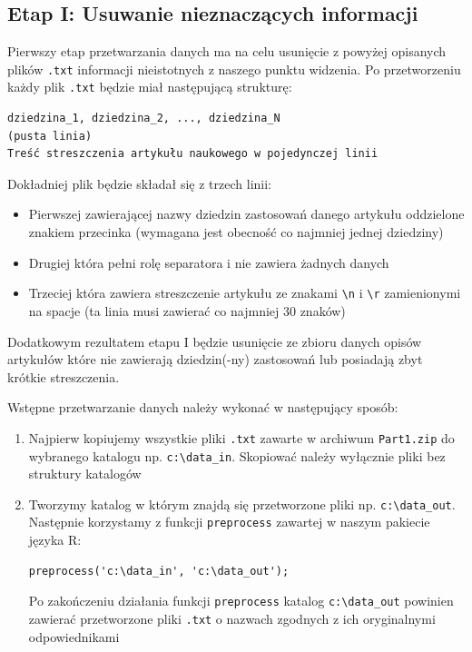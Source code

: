\documentclass[a4paper,12pt]{article}
\begin{document}
	\subsection{Etap I: Usuwanie nieznaczących informacji}
		Pierwszy etap przetwarzania danych ma na celu usunięcie z powyżej
		opisanych plików \texttt{.txt} informacji nieistotnych z naszego punktu
		widzenia. Po przetworzeniu każdy plik \texttt{.txt} będzie miał 	
		następującą strukturę:
		\begin{verbatim}
dziedzina_1, dziedzina_2, ..., dziedzina_N
(pusta linia)
Treść streszczenia artykułu naukowego w pojedynczej linii
		\end{verbatim}
		Dokładniej plik będzie składał się z trzech linii:
		\begin{itemize}
			\item
				Pierwszej zawierającej nazwy dziedzin zastosowań danego artykułu
				oddzielone znakiem przecinka (wymagana jest obecność co najmniej
				jednej dziedziny)
			\item
				Drugiej która pełni rolę separatora i nie zawiera żadnych 
				danych
			\item
				Trzeciej która zawiera streszczenie artykułu ze znakami 
				\verb+\n+ i \verb+\r+ zamienionymi na spacje
				(ta linia musi zawierać co najmniej 30 znaków)
		\end{itemize}
				
		Dodatkowym rezultatem etapu I będzie usunięcie ze zbioru danych 
		opisów artykułów które nie zawierają dziedzin(-ny) zastosowań lub
		posiadają zbyt krótkie streszczenia.
		
		Wstępne przetwarzanie danych należy wykonać w 
		następujący sposób:
		\begin{enumerate}
			\item
				Najpierw kopiujemy wszystkie pliki \verb+.txt+ zawarte
				w archiwum \texttt{Part1.zip} do wybranego katalogu
				np. \verb+c:\data_in+. Skopiować należy wyłącznie pliki
				bez struktury katalogów
			\item
				Tworzymy katalog w którym znajdą się przetworzone pliki
				np. \verb+c:\data_out+. Następnie korzystamy z
				funkcji \texttt{preprocess} zawartej w naszym pakiecie języka R:
				\begin{verbatim}
preprocess('c:\data_in', 'c:\data_out');
				\end{verbatim}
				Po zakończeniu działania funkcji \texttt{preprocess} katalog
				\verb+c:\data_out+ powinien zawierać przetworzone pliki
				\verb+.txt+ o nazwach zgodnych z ich oryginalnymi odpowiednikami
		\end{enumerate}	
		
\end{document}
